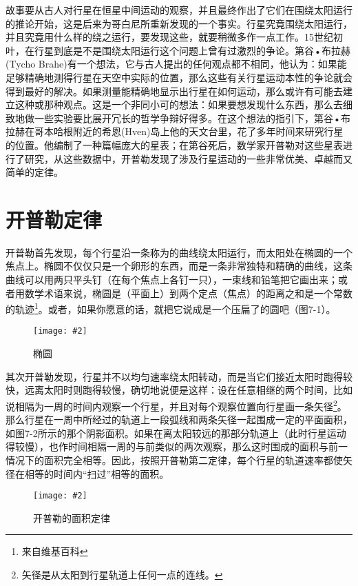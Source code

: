 \documentclass[12pt,oneside]{book}
\newenvironment{fig}[2][1]
{\begin{figure}[H]
\centering
\texttt{[image: \#2]}}
{\end{figure}}
\begin{document}
故事要从古人对行星在恒星中间运动的观察，并且最终作出了它们在围绕太阳运行的推论开始，这是后来为哥白尼所重新发现的一个事实。行星究竟围绕太阳运行，并且究竟用什么样的绕之运行，要发现这些，就要稍微多作一点工作。15世纪初叶，在行星到底是不是围绕太阳运行这个问题上曾有过激烈的争论。第谷•布拉赫(Tycho Brahe)有一个想法，它与古人提出的任何观点都不相同，他认为：如果能足够精确地测得行星在天空中实际的位置，那么这些有关行星运动本性的争论就会得到最好的解决。如果测量能精确地显示出行星在如何运动，那么或许有可能去建立这种或那种观点。这是一个非同小可的想法：如果要想发现什么东西，那么去细致地做一些实验要比展开冗长的哲学争辩好得多。在这个想法的指引下，第谷•布拉赫在哥本哈根附近的希恩(Hven)岛上他的天文台里，花了多年时间来研究行星的位置。他编制了一种篇幅庞大的星表；在第谷死后，数学家开普勒对这些星表进行了研究，从这些数据中，开普勒发现了涉及行星运动的一些非常优美、卓越而又简单的定律。



\section{开普勒定律}
开普勒首先发现，每个行星沿一条称为的曲线绕太阳运行，而太阳处在椭圆的一个焦点上。椭圆不仅仅只是一个卵形的东西，而是一条非常独特和精确的曲线，这条曲线可以用两只平头钉（在每个焦点上各钉一只），一束线和铅笔把它画出来；或者用数学术语来说，椭圆是（平面上）到两个定点（焦点）的距离之和是一个常数的轨迹\footnote{来自维基百科}。或者，如果你愿意的话，就把它说成是一个压扁了的圆吧（图7-1）。
\begin{fig}{椭圆}
\caption{椭圆}
\label{fig:椭圆}
\end{fig}

其次开普勒发现，行星并不以均匀速率绕太阳转动，而是当它们接近太阳时跑得较快，远离太阳时则跑得较慢，确切地说便是这样：设在任意相继的两个时间，比如说相隔为一周的时间内观察一个行星，并且对每个观察位置向行星画一条矢径\footnote{矢径是从太阳到行星轨道上任何一点的连线。}。那么行星在一周中所经过的轨道上一段弧线和两条矢径一起围成一定的平面面积，如图7-2所示的那个阴影面积。如果在离太阳较远的那部分轨道上（此时行星运动得较慢），也作时间相隔一周的与前类似的两次观察，那么这时围成的面积与前一情况下的面积完全相等。因此，按照开普勒第二定律，每个行星的轨道速率都使矢径在相等的时间内“扫过”相等的面积。
\begin{fig}{开普勒的面积定律}
\caption{开普勒的面积定律}
\label{fig:开普勒的面积定律}
\end{fig}
\end{document}
